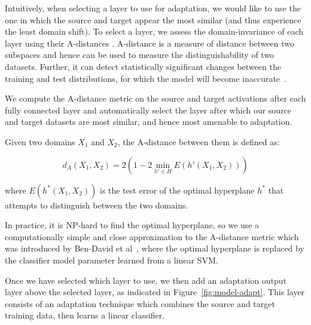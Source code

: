 Intuitively, when selecting a layer to use for adaptation, we would like to use
the one in which the source and target appear the most similar (and thus
experience the least domain shift).
To select a layer, we assess the domain-invariance of each layer using their A-distances
\cite{adist}. A-distance is a measure of distance between two subspaces and hence can be used to measure the distinguishability of two datasets. Further, it can detect statistically significant 
changes between the training and test distributions, for which the model will become inaccurate~\cite{adist}.

We compute the A-distance metric on the source and target activations after each fully 
connected layer
and automatically select the  layer after which
our source and target datasets are most similar, and hence most amenable to adaptation.

Given two domains $X_1$ and $X_2$, the A-distance between them is defined as:

\begin{equation}
  d_A(X_1, X_2) = 2 \left( 1 - 2 \min_{h' \in H} E(h'(X_1, X_2))\right)
\end{equation}


where $E(h^*(X_1, X_2))$ is the test error of the optimal hyperplane $h^*$ that attempts to
distinguish between the two domains.

In practice, it is NP-hard to find the optimal hyperplane, so we use a computationally simple and 
close approximation to the A-distance metric which was introduced by Ben-David et al~\cite{adist-comp}, 
where the optimal hyperplane is replaced by the classifier model parameter learned from a linear SVM.

Once we have selected which layer to use, we then add an adaptation output layer above the selected layer, as indicated in Figure~\ref{fig:model-adapt}. This layer
consists of an adaptation technique which combines the source and target
training data, then learns a linear classifier.

